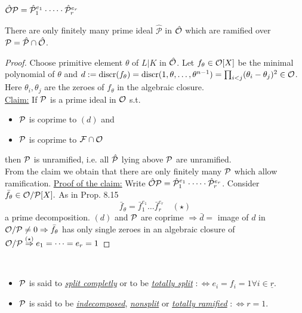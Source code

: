 
\hspace*{4cm}$\hat {\mathcal{O}} \mathcal{P}  = \hat{\mathcal P}_1^{e_1} \cdot \dots \cdot \hat{\mathcal P}_r^{e_r}$ \quad \quad 
{}

\begin{Prop}
There are only finitely many prime ideal $\hat{\mathcal P}$ in $\hat {\mathcal{O}}$ which are ramified over $\mathcal{P}= \hat{\mathcal P} \cap \hat {\mathcal{O}}$.
\end{Prop}

\begin{proof}
Choose primitive element $\theta$ of $L | K$ in $\hat{\mathcal{O}}$. Let $f_\theta \in \mathcal{O}[X]$ be the minimal polynomial of $\theta$ and $d:=\operatorname{discr}(f_\theta)=\operatorname{discr}(1, \theta, \ldots, \theta^{n-1})=\prod_{i <j}(\theta_i-\theta_j)^2 \in \mathcal{O}$.\\
Here $\theta_i, \theta_j$ are the zeroes of $f_\theta$ in the algebraic closure.\\
\underline{Claim:} If $\mathcal{P}$ is a prime ideal in $\mathcal{O}$ s.t.
\begin{itemize}
\item $\mathcal{P}$ is coprime to $(d)$ and
\item $\mathcal{P}$ is coprime to $\mathcal{F} \cap \mathcal{O}$
\end{itemize}
then $\mathcal{P}$ is unramified, i.e. all $\hat{\mathcal{P}}$ lying above $\mathcal{P}$ are unramified.\\
From the claim we obtain that there are only finitely many $\mathcal{P}$ which allow ramification.
\underline{Proof of the claim:} Write $\hat{\mathcal{O}}\mathcal{P}=\hat{\mathcal{P}}_1^{e_1}\cdot \dots \cdot \hat{\mathcal{P}}_r^{e_r}$. Consider $\bar{f}_\theta\in \mathcal{O}/\mathcal{P}[X].$ As in Prop. 8.15
\[\bar{f}_\theta = \bar{f}_1^{e_1} \dots \bar{f}_r^{e_r} \quad  (\star)\]
a prime decomposition. $(d)$ and $\mathcal{P}$ are coprime $\Rightarrow \bar{d}=$ image of $d$ in $\mathcal{O}/\mathcal{P} \neq 0 \Rightarrow \bar{f}_\theta$ has only single zeroes in an algebraic closure of $\mathcal{O}/\mathcal{P} \stackrel{(\star)}{\Rightarrow} e_1=\dots=e_r=1$
\end{proof}

\begin{defi}\ \vspace*{-\baselineskip} \\
\begin{itemize}
\item $\mathcal{P}$ is said to \emph{\underline{split completly}} or to be \emph{\underline{totally split}} $:\iff e_i=f_i=1 \forall i \in \underline{r}$.
\item $\mathcal{P}$ is said to be \emph{\underline{indecomposed}}, \emph{\underline{nonsplit}} or \emph{\underline{totally ramified}} $:\iff r=1$.
\end{itemize}
\end{defi}

